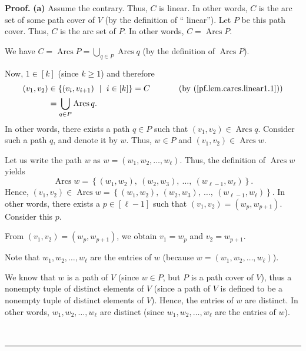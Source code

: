 \documentclass[numbers=enddot,12pt,final,onecolumn,notitlepage]{scrartcl}%
\numberwithin{exer}{section}
\theoremstyle{definition}
\newenvironment{proof}[1][Proof]{\noindent\textbf{#1.} }{\ \rule{0.5em}{0.5em}}
\let\cupnonlimits\bigcup
\renewcommand{\bigcup}{\cupnonlimits\limits}
\newenvironment{verlong}{}{}
\begin{document}
\begin{verlong}
\begin{proof}
\textbf{(a)} Assume the contrary. Thus, $C$ is linear. In other words, $C$ is
the arc set of some path cover of $V$ (by the definition of \textquotedblleft
linear\textquotedblright). Let $P$ be this path cover. Thus, $C$ is the arc
set of $P$. In other words, $C=\operatorname*{Arcs}P$.

We have $C=\operatorname*{Arcs}P=\bigcup_{q\in P}\operatorname*{Arcs}q$ (by
the definition of $\operatorname*{Arcs}P$).

Now, $1\in\left[  k\right]  $ (since $k\geq1$) and therefore
\begin{align*}
\left(  v_{1},v_{2}\right)   &  \in\left\{  \left(  v_{i},v_{i+1}\right)
\ \mid\ i\in\left[  k\right]  \right\}  =C\ \ \ \ \ \ \ \ \ \ \left(  \text{by
(\ref{pf.lem.carcs.linear1.1})}\right) \\
&  =\bigcup_{q\in P}\operatorname*{Arcs}q.
\end{align*}
In other words, there exists a path $q\in P$ such that $\left(  v_{1}%
,v_{2}\right)  \in\operatorname*{Arcs}q$. Consider such a path $q$, and denote
it by $w$. Thus, $w\in P$ and $\left(  v_{1},v_{2}\right)  \in
\operatorname*{Arcs}w$.

Let us write the path $w$ as $w=\left(  w_{1},w_{2},\ldots,w_{\ell}\right)  $.
Thus, the definition of $\operatorname*{Arcs}w$ yields%
\[
\operatorname*{Arcs}w=\left\{  \left(  w_{1},w_{2}\right)  ,\ \left(
w_{2},w_{3}\right)  ,\ \ldots,\ \left(  w_{\ell-1},w_{\ell}\right)  \right\}
.
\]
Hence, $\left(  v_{1},v_{2}\right)  \in\operatorname*{Arcs}w=\left\{  \left(
w_{1},w_{2}\right)  ,\ \left(  w_{2},w_{3}\right)  ,\ \ldots,\ \left(
w_{\ell-1},w_{\ell}\right)  \right\}  $. In other words, there exists a
$p\in\left[  \ell-1\right]  $ such that $\left(  v_{1},v_{2}\right)  =\left(
w_{p},w_{p+1}\right)  $. Consider this $p$.

From $\left(  v_{1},v_{2}\right)  =\left(  w_{p},w_{p+1}\right)  $, we obtain
$v_{1}=w_{p}$ and $v_{2}=w_{p+1}$.

Note that $w_{1},w_{2},\ldots,w_{\ell}$ are the entries of $w$ (because
$w=\left(  w_{1},w_{2},\ldots,w_{\ell}\right)  $).

We know that $w$ is a path of $V$ (since $w\in P$, but $P$ is a path cover of
$V$), thus a nonempty tuple of distinct elements of $V$ (since a path of $V$
is defined to be a nonempty tuple of distinct elements of $V$). Hence, the
entries of $w$ are distinct. In other words, $w_{1},w_{2},\ldots,w_{\ell}$ are
distinct (since $w_{1},w_{2},\ldots,w_{\ell}$ are the entries of $w$).


\end{proof}
\end{verlong}
\end{document}
